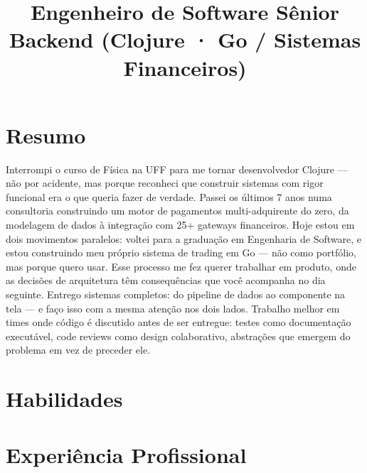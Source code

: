 \documentclass[10pt,a4paper,sans]{moderncv}
\title{Engenheiro de Software Sênior Backend (Clojure · Go / Sistemas Financeiros)}
\begin{document}
\makecvtitle

\section{Resumo}
Interrompi o curso de Física na UFF para me tornar desenvolvedor Clojure --- não por acidente, mas porque reconheci que construir sistemas com rigor funcional era o que queria fazer de verdade. Passei os últimos 7 anos numa consultoria construindo um motor de pagamentos multi-adquirente do zero, da modelagem de dados à integração com 25+ gateways financeiros. Hoje estou em dois movimentos paralelos: voltei para a graduação em Engenharia de Software, e estou construindo meu próprio sistema de trading em Go --- não como portfólio, mas porque quero usar. Esse processo me fez querer trabalhar em produto, onde as decisões de arquitetura têm consequências que você acompanha no dia seguinte. Entrego sistemas completos: do pipeline de dados ao componente na tela --- e faço isso com a mesma atenção nos dois lados. Trabalho melhor em times onde código é discutido antes de ser entregue: testes como documentação executável, code reviews como design colaborativo, abstrações que emergem do problema em vez de preceder ele.

\section{Habilidades}

\section{Experiência Profissional}
\end{document}
